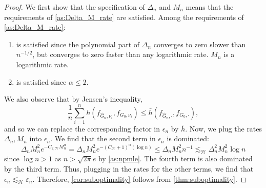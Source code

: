 \documentclass[12pt, reqno]{amsart}
\newcommand{\fs}[1]{f_{#1, \boldsymbol{\cdot}}}
\newcommand{\barh}{\bar h}
\newcommand{\Hyperparams}{\mathcal{H}}
\newcommand{\leH}{\lesssim_{\mathcal{H}}}
\numberwithin{equation}{section}
\begin{document}
\begin{refsection}
\begin{appendices}
\begin{proof}
We first show that the specification of $\Delta_n$ and $M_n$ means that the requirements
of \cref{as:Delta_M_rate} are satisfied. Among the requirements of \cref{as:Delta_M_rate}:
\begin{enumerate}[wide]
    \item is satisfied since the polynomial part of $\Delta_n$ converges to zero slower
    than $n^{-1/2}$, but converges to zero faster than any logarithmic rate. $M_n$ is a
    logarithmic rate.
    \item is satisfied since $\alpha \le 2$.
\end{enumerate}

We also observe that by Jensen's inequality, \[
\frac{1}{n} \sum_{i=1}^n h(f_{\hat G_n, \nu_i}, f_{G_0, \nu_i}) \le \barh(\fs{\hat G_n},
\fs{G_0}),
\]
and so we can replace the corresponding factor in $\epsilon_n$ by $\barh$.
Now, we plug the rates $\Delta_n, M_n$ into $\epsilon_n$. We find that the second term in
$\epsilon_n$
is dominated: \[
\Delta_n M_n^2 e^{-C_{2,\Hyperparams} M_n^\alpha} = \Delta_n M_n^2 e^{
    -(C_\Hyperparams + 1)^\alpha (\log n)
} \le \Delta_n M_n^2 n^{-1} \leH
\Delta_n^2 M_n^2 \log n
\]
since $\log n > 1$ as $n > \sqrt{2\pi} e$ by \cref{as:npmle}. The fourth term is also
dominated by the third term. Thus, plugging in the rates for
the other terms, we find that $
\epsilon_n \leH \varepsilon_n. $ Therefore, \cref{cor:suboptimality} follows from
\cref{thm:suboptimality}.
\end{proof}



\end{appendices}
\end{refsection}
\end{document}
